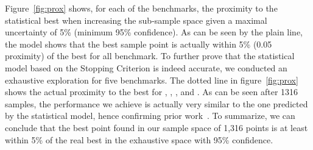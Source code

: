 Figure~\ref{fig:prox} shows, for each of the benchmarks, the proximity to the statistical best when increasing the sub-sample space given a maximal uncertainty of 5\%  (\ie minimum 95\% confidence).
As can be seen by the plain line, the model shows that the best sample point is actually within 5\% (0.05 proximity) of the best for all benchmark.
To further prove that the statistical model based on the Stopping Criterion is indeed accurate, we conducted an exhaustive exploration for five benchmarks.
The dotted line in figure~\ref{fig:prox} shows the actual proximity to the best for , , ,  and .
As can be seen after 1316 samples, the performance we achieve is actually very similar to the one predicted by the statistical model, hence confirming prior work~\cite{vuduc2003AutomaticPerf}.
To summarize, we can conclude that the best point found in our sample space of 1,316 points is at least within 5\% of the real best in the exhaustive space with 95\% confidence.


